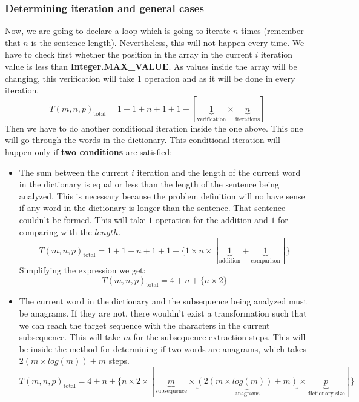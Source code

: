\documentclass{article}
\begin{document}
	\subsubsection{Determining iteration and general cases}
	Now, we are going to declare a loop which is going to
	iterate $n$ times (remember that $n$ is the sentence length). Nevertheless, this will not
	happen every time. We have to check first whether the position
	in the array in the current $i$ iteration value is less than
	\textbf{Integer.MAX\_VALUE}. As values inside the array will
	be changing, this verification will take 1 operation and as
	it will be done in every iteration.
	\[
	T(m, n, p)_\text{total} = 1 + 1 + n + 1 + 1 + [\underbrace{1}_\text{verification} \times \underbrace{n}_\text{iterations}]
	\]
	Then we have to do another conditional iteration inside the
	one above. This one will go through the words in the dictionary.
	This conditional iteration will happen only if \textbf{two conditions}
	are satisfied:
	\begin{itemize}
		\item The sum between the current $i$ iteration and the length of
		the current word in the dictionary is equal or less than the length
		of the sentence being analyzed. This is necessary because the problem
		definition will no have sense if any word in the dictionary is longer
		than the sentence. That sentence couldn't be formed. This will take
		$1$ operation for the addition and $1$ for comparing with the $length$.
		\[
		T(m, n, p)_\text{total} = 1 + 1 + n + 1 + 1 + \{1 \times n \times [\underbrace{1}_\text{addition} + \underbrace{1}_\text{comparison}]\}
		\] 
		Simplifying the expression we get:
		\[
		T(m, n, p)_\text{total} = 4 + n + \{n \times 2\}
		\]
		\item The current word in the dictionary and the subsequence being
		analyzed must be anagrams. If they are not, there wouldn't exist a
		transformation such that we can reach the target sequence with the
		characters in the current subsequence. This will take $m$ for the
		subsequence extraction steps. This will be inside the method for determining
		if two words are anagrams, which takes $2(m \times log(m)) + m$ steps.
		\[
		T(m, n, p)_\text{total} = 4 + n + \{n \times 2 \times [\underbrace{m}_\text{subsequence} \times \underbrace{(2(m \times log(m)) + m)}_\text{anagrams} \times \underbrace{p}_\text{dictionary size}]\}
		\] 
	\end{itemize}
	\vspace{2pt}
	
\end{document}
